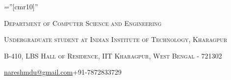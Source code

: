 \documentclass[a4paper,10pt]{extarticle} %
\begin{document}
\pagestyle{empty} %

\font\fb=''[cmr10]'' %


\par{\par} %
\par{\centering\large {\textsc{Department of Computer Science and Engineering}}\par}\large
\par{\centering\large {\textsc{Undergraduate student at Indian Institute of Technology, Kharagpur}}\par}\large
\par{\centering\large {\textsc{B-410, LBS Hall of Residence, IIT Kharagpur, West Bengal - 721302}}\par}\large
\hspace{3.5cm}\normalsize {\href{mailto:nareshmdu@gmail.com}{nareshmdu@gmail.com}}\hfill{+91-7872833729}\hspace{3.5cm}

%

\end{document}
